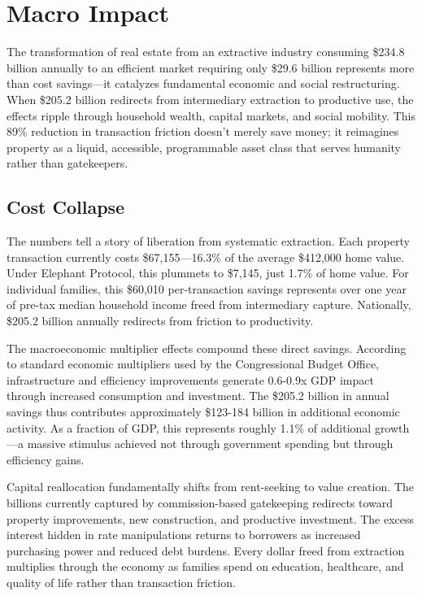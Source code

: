 \chapter{Macro Impact}

The transformation of real estate from an extractive industry consuming \$234.8 billion annually to an efficient market requiring only \$29.6 billion represents more than cost savings---it catalyzes fundamental economic and social restructuring. When \$205.2 billion redirects from intermediary extraction to productive use, the effects ripple through household wealth, capital markets, and social mobility. This 89\% reduction in transaction friction doesn't merely save money; it reimagines property as a liquid, accessible, programmable asset class that serves humanity rather than gatekeepers.

\section{Cost Collapse}

The numbers tell a story of liberation from systematic extraction. Each property transaction currently costs \$67,155---16.3\% of the average \$412,000 home value. Under Elephant Protocol, this plummets to \$7,145, just 1.7\% of home value. For individual families, this \$60,010 per-transaction savings represents over one year of pre-tax median household income freed from intermediary capture. Nationally, \$205.2 billion annually redirects from friction to productivity.

The macroeconomic multiplier effects compound these direct savings. According to standard economic multipliers used by the Congressional Budget Office, infrastructure and efficiency improvements generate 0.6-0.9x GDP impact through increased consumption and investment. The \$205.2 billion in annual savings thus contributes approximately \$123-184 billion in additional economic activity. As a fraction of GDP, this represents roughly 1.1\% of additional growth---a massive stimulus achieved not through government spending but through efficiency gains.

Capital reallocation fundamentally shifts from rent-seeking to value creation. The billions currently captured by commission-based gatekeeping redirects toward property improvements, new construction, and productive investment. The excess interest hidden in rate manipulations returns to borrowers as increased purchasing power and reduced debt burdens. Every dollar freed from extraction multiplies through the economy as families spend on education, healthcare, and quality of life rather than transaction friction.

